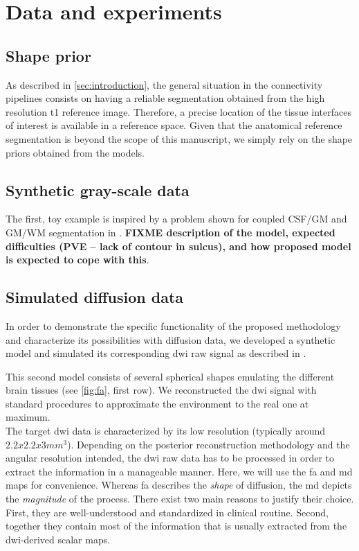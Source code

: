 \section{Data and experiments}
\label{sec:experiments}
%
\subsection{Shape prior}
%
As described in \autoref{sec:introduction}, the general situation in
the connectivity pipelines consists on having 
a reliable segmentation obtained from the high resolution \ac{t1} 
reference image. Therefore, a precise location of the tissue interfaces
of interest is available in a reference space. Given that the anatomical reference segmentation is beyond the scope of this manuscript, we simply rely on the shape priors obtained from the models. \\

%
\subsection{Synthetic gray-scale data}
%
The first, toy example is inspired by a problem shown for coupled CSF/GM and GM/WM segmentation in \cite{MacDonald2000}. \textbf{FIXME description of the model, expected difficulties (PVE -- lack of contour in sulcus), and how proposed model is expected to cope with this}.

%
\subsection{Simulated diffusion data}
%
In order to demonstrate the specific functionality of the proposed
methodology and characterize its possibilities with diffusion data, we developed a
synthetic model and simulated its corresponding \ac{dwi}
raw signal as described in \citep{tuch_q-ball_2004}. 

This second model consists of several spherical shapes emulating
the different brain tissues (see \autoref{fig:fa}, first row). 
We reconstructed the \ac{dwi} signal with standard procedures to approximate the
environment to the real one at maximum. \\

The target \ac{dwi} data is characterized by its
low resolution (typically around $2.2x2.2x3mm^3$). Depending on the
posterior reconstruction methodology and the angular resolution
intended, the \ac{dwi} raw data has to be processed in order to
extract the information in a manageable manner. Here, we
will use the \ac{fa} and \ac{md} maps for convenience.
Whereas \ac{fa} describes the \emph{shape} of diffusion, 
the \ac{md} depicts the \emph{magnitude} of the process. 
There exist two main reasons to justify their choice. 
First, they are well-understood and standardized in clinical routine.
Second, together they contain most of the information that is
usually extracted from the \ac{dwi}-derived scalar maps. \\


